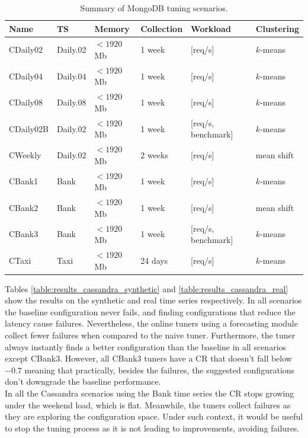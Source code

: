 \documentclass[a4paper, 12pt]{article} %
\newcommand{\ra}[1]{\renewcommand{\arraystretch}{#1}}
\begin{document}
	\begin{table}\centering 
		\ra{1.3}
		\begin{tabularx}{\textwidth}{@{}llllXX@{}}
			\midrule
			Name & TS & Memory & Collection & Workload & Clustering\\
			\midrule
			CDaily02&Daily.02 & $<1920$Mb  & 1 week & [req/s]  & $k$-means\\
			CDaily04&Daily.04 & $<1920$Mb  & 1 week & [req/s]  & $k$-means\\
			CDaily08&Daily.08 & $<1920$Mb  & 1 week & [req/s] & $k$-means\\
			CDaily02B&Daily.02 & $<1920$Mb  & 1 week & [req/s, benchmark] & $k$-means\\
			CWeekly&Daily.02 & $<1920$Mb  & 2 weeks & [req/s]  & mean shift\\
			CBank1&Bank & $<1920$Mb  & 1 week & [req/s]  & $k$-means\\
			CBank2&Bank & $<1920$Mb  & 1 week & [req/s]  & mean shift\\
			CBank3&Bank & $<1920$Mb  & 1 week & [req/s, benchmark]  & $k$-means\\
			CTaxi &Taxi & $<1920$Mb  & 24 days & [req/s]  & $k$-means\\
			
			\bottomrule
		\end{tabularx}
		\caption{Summary of MongoDB tuning scenarios. }  \label{table:results_tuning_scenarios_cassandra}
	\end{table}

	Tables \ref{table:results_cassandra_synthetic} and \ref{table:results_cassandra_real} show the results on the synthetic and real time series respectively.
	In all scenarios the baseline configuration never fails, and finding configurations that reduce the latency cause failures. Nevertheless, the online tuners using a forecasting module collect fewer failures when compared to the naive tuner. Furthermore, the tuner always instantly finds a better configuration than the baseline in all scenarios except CBank3. However, all CBank3 tuners have a CR that doesn't fall below $-0.7$ meaning that practically, besides the failures, the suggested configurations don't downgrade the baseline performance. \\
	In all the Cassandra scenarios using the Bank time series the CR stops growing under the weekend load, which is flat. Meanwhile, the tuners collect failures as they are exploring the configuration space. Under such context, it would be useful to stop the tuning process as it is not leading to improvements, avoiding failures.
	
\end{document}
